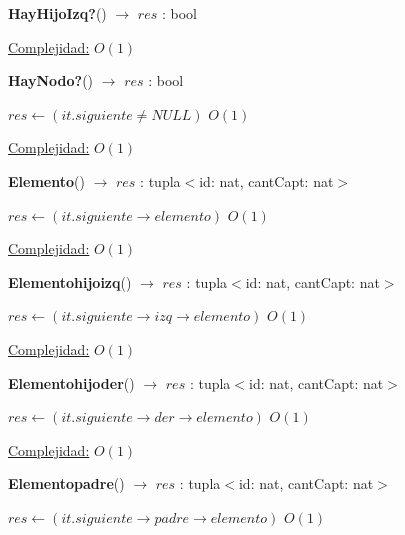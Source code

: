 \begin{Algoritmos}
\begin{algorithm}[H]{\textbf{HayHijoIzq?}() $\to$ $res$ : bool}
\begin{algorithmic}[1]
			\medskip
			\Statex \underline{Complejidad:} $O(1)$
    	\end{algorithmic}
\end{algorithm}

\begin{algorithm}[H]{\textbf{HayNodo?}() $\to$ $res$ : bool}
    	\begin{algorithmic}[1]
			 \State $res \gets  (it.siguiente \not= NULL) $ \Comment $O(1)$

			\medskip
			\Statex \underline{Complejidad:} $O(1)$
    	\end{algorithmic}
\end{algorithm}

\begin{algorithm}[H]{\textbf{Elemento}() $\to$ $res$ : tupla$<$id: nat, cantCapt: nat$>$}
    	\begin{algorithmic}[1]
			 \State $res \gets  (it.siguiente \rightarrow elemento) $ \Comment $O(1)$

			\medskip
			\Statex \underline{Complejidad:} $O(1)$
    	\end{algorithmic}
\end{algorithm}

\begin{algorithm}[H]{\textbf{Elementohijoizq}() $\to$ $res$ : tupla$<$id: nat, cantCapt: nat$>$}
    	\begin{algorithmic}[1]
			 \State $res \gets  (it.siguiente  \rightarrow izq \rightarrow elemento) $ \Comment $O(1)$

			\medskip
			\Statex \underline{Complejidad:} $O(1)$
    	\end{algorithmic}
\end{algorithm}

\begin{algorithm}[H]{\textbf{Elementohijoder}() $\to$ $res$ : tupla$<$id: nat, cantCapt: nat$>$}
    	\begin{algorithmic}[1]
			 \State $res \gets  (it.siguiente  \rightarrow der \rightarrow elemento) $ \Comment $O(1)$

			\medskip
			\Statex \underline{Complejidad:} $O(1)$
    	\end{algorithmic}
\end{algorithm}

\begin{algorithm}[H]{\textbf{Elementopadre}() $\to$ $res$ : tupla$<$id: nat, cantCapt: nat$>$}
    	\begin{algorithmic}[1]
			 \State $res \gets  (it.siguiente  \rightarrow padre \rightarrow elemento) $ \Comment $O(1)$


\end{algorithmic}
\end{algorithm}
\end{Algoritmos}

